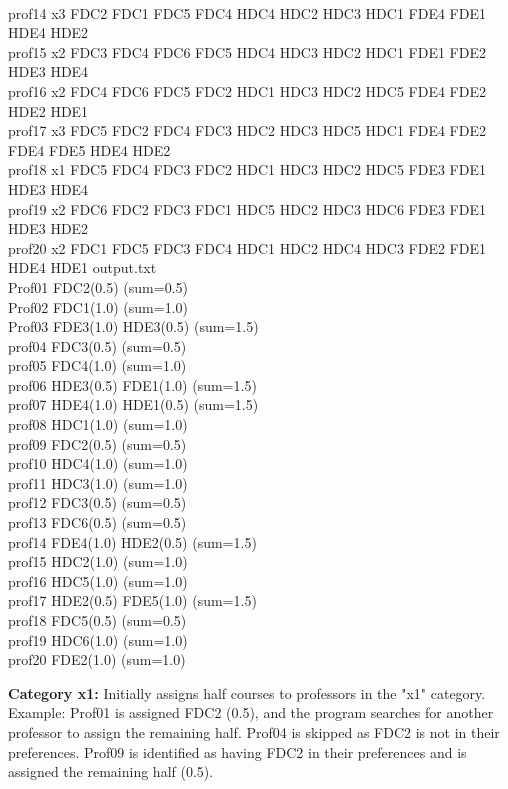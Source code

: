 \documentclass{article}
\begin{document}
\\prof14  x3 FDC2 FDC1 FDC5 FDC4 HDC4 HDC2 HDC3 HDC1 FDE4 FDE1 HDE4 HDE2 
\\prof15  x2 FDC3 FDC4 FDC6 FDC5 HDC4 HDC3 HDC2 HDC1 FDE1 FDE2 HDE3 HDE4 
\\prof16  x2 FDC4 FDC6 FDC5 FDC2 HDC1 HDC3 HDC2 HDC5 FDE4 FDE2 HDE2 HDE1
\\prof17  x3 FDC5 FDC2 FDC4 FDC3 HDC2 HDC3 HDC5 HDC1 FDE4 FDE2 FDE4 FDE5 HDE4 HDE2
\\prof18  x1 FDC5 FDC4 FDC3 FDC2 HDC1 HDC3 HDC2 HDC5 FDE3 FDE1 HDE3 HDE4
\\prof19  x2 FDC6 FDC2 FDC3 FDC1 HDC5 HDC2 HDC3 HDC6 FDE3 FDE1 HDE3 HDE2 
\\prof20  x2 FDC1 FDC5 FDC3 FDC4 HDC1 HDC2 HDC4 HDC3 FDE2 FDE1 HDE4 HDE1
\break
\break
output.txt
\\Prof01 FDC2(0.5)   (sum=0.5)
\\Prof02 FDC1(1.0)   (sum=1.0)
\\Prof03 FDE3(1.0) HDE3(0.5)   (sum=1.5)
\\prof04 FDC3(0.5)   (sum=0.5)
\\prof05 FDC4(1.0)   (sum=1.0)
\\prof06 HDE3(0.5) FDE1(1.0)   (sum=1.5)
\\prof07 HDE4(1.0) HDE1(0.5)   (sum=1.5)
\\prof08 HDC1(1.0)   (sum=1.0)
\\prof09 FDC2(0.5)   (sum=0.5)
\\prof10 HDC4(1.0)   (sum=1.0)
\\prof11 HDC3(1.0)   (sum=1.0)
\\prof12 FDC3(0.5)   (sum=0.5)
\\prof13 FDC6(0.5)   (sum=0.5)
\\prof14 FDE4(1.0) HDE2(0.5)   (sum=1.5)
\\prof15 HDC2(1.0)   (sum=1.0)
\\prof16 HDC5(1.0)   (sum=1.0)
\\prof17 HDE2(0.5) FDE5(1.0)   (sum=1.5)
\\prof18 FDC5(0.5)   (sum=0.5)
\\prof19 HDC6(1.0)   (sum=1.0)
\\prof20 FDE2(1.0)   (sum=1.0)
\break
\break






\textbf{Category x1:} Initially assigns half courses to professors in the "x1" category. Example: Prof01 is assigned FDC2 (0.5), and the program searches for another professor to assign the remaining half. Prof04 is skipped as FDC2 is not in their preferences. Prof09 is identified as having FDC2 in their preferences and is assigned the remaining half (0.5).
\end{document}
